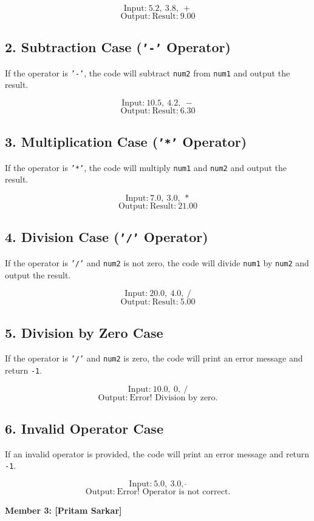 \documentclass{article}
\begin{document}
\[
\text{Input:} \ 5.2, \ 3.8, \ +
\]
\[
\text{Output:} \ \text{Result:} \ 9.00
\]

\subsection{2. Subtraction Case (\texttt{'-'} Operator)}
If the operator is \texttt{'-'}, the code will subtract \texttt{num2} from \texttt{num1} and output the result.

\[
\text{Input:} \ 10.5, \ 4.2, \ -
\]
\[
\text{Output:} \ \text{Result:} \ 6.30
\]

\subsection{3. Multiplication Case (\texttt{'*'} Operator)}
If the operator is \texttt{'*'}, the code will multiply \texttt{num1} and \texttt{num2} and output the result.

\[
\text{Input:} \ 7.0, \ 3.0, \ *
\]
\[
\text{Output:} \ \text{Result:} \ 21.00
\]

\subsection{4. Division Case (\texttt{'/'} Operator)}
If the operator is \texttt{'/'} and \texttt{num2} is not zero, the code will divide \texttt{num1} by \texttt{num2} and output the result.

\[
\text{Input:} \ 20.0, \ 4.0, \ /
\]
\[
\text{Output:} \ \text{Result:} \ 5.00
\]

\subsection{5. Division by Zero Case}
If the operator is \texttt{'/'} and \texttt{num2} is zero, the code will print an error message and return \texttt{-1}.

\[
\text{Input:} \ 10.0, \ 0, \ /
\]
\[
\text{Output:} \ \text{Error! Division by zero.}
\]

\subsection{6. Invalid Operator Case}
If an invalid operator is provided, the code will print an error message and return \texttt{-1}.

\[
\text{Input:} \ 5.0, \ 3.0, \ \hat{ } 
\]
\[
\text{Output:} \ \text{Error! Operator is not correct.}
\]
\vspace{10in}
\begin{center}
    \textbf{\LARGE{{Member 3: [Pritam Sarkar]}}}
\end{center}
\end{document}
